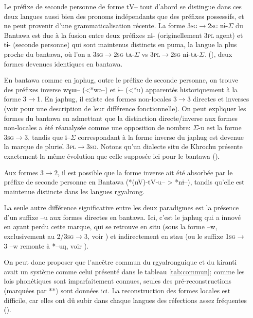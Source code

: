 \documentclass[oldfontcommands,oneside,a4paper,11pt]{article}
\newcommand{\ipa}[1]{{\phon \mbox{#1}}} %
\newcommand{\ro}{$\Sigma$}
\begin{document}
Le préfixe de seconde personne de forme \ipa{tV--} tout d'abord se distingue dans ces deux langues aussi bien des pronoms indépendants que des préfixes possessifs, et ne peut provenir d'une grammaticalisation récente. La forme \textsc{3sg$\rightarrow$2sg} \ipa{nɨ-}\ro{} du Bantawa est due à la fusion entre deux préfixes \ipa{nɨ-} (originellement \textsc{3pl} agent)  et \ipa{tɨ-} (seconde personne) qui sont maintenus distincts en puma, la langue la plus proche du bantawa, où l'on a \textsc{3sg$\rightarrow$2sg} \ipa{tʌ-}\ro{} vs \textsc{3pl$\rightarrow$2sg} \ipa{ni-tʌ-}\ro{}. (\citealt{bickel07puma}), deux formes devenues identiques en bantawa.

En bantawa comme en japhug, outre le préfixe de seconde personne, on trouve des préfixes  inverse \ipa{wɣɯ--} (<*\ipa{wə--}) et \ipa{ɨ--} (<*\ipa{u}) apparentés historiquement à la forme \textsc{3$\rightarrow$1}. En japhug, il existe des formes non-locales 3$\rightarrow$3 directes et inverses (voir  \citealt{jacques10inverse} pour une description de leur différence fonctionnelle). On peut expliquer les formes du bantawa en admettant que la distinction directe/inverse aux formes non-locales a été réanalysée comme une opposition de nombre:  \ro{}-\ipa{u} est la forme \textsc{3sg$\rightarrow$3}, tandis que  \ipa{ɨ--}\ro{} correspondant à la forme inverse du japhug est devenue la marque de pluriel \textsc{3pl$\rightarrow$3sg}. Notons qu'un dialecte situ de Khrochu présente exactement la même évolution que celle supposée ici pour le bantawa (\citealt{jackson15khrochu}).

Aux formes \textsc{3$\rightarrow$2}, il est possible que la forme inverse ait été absorbée par le préfixe de seconde personne en Bantawa (*\ipa{(nV)-tV-u--}  > *\ipa{nɨ--}), tandis qu'elle est maintenue distincte dans les langues rgyalrong. 

La seule autre différence significative entre les deux paradigmes est la présence d'un suffixe \ipa{--u} aux formes directes en bantawa. Ici, c'est le japhug qui a innové en ayant perdu cette marque, qui se retrouve en situ (sous la forme \ipa{--w}, exclusivement au \textsc{2/3sg$\rightarrow$3}, voir \citealt{linyj03tense}) et indirectement en stau (ou le suffixe \textsc{1sg$\rightarrow$3} \ipa{--w} remonte à *\ipa{--uŋ}, voir \citealt{jacques14rtau}).

On peut donc proposer que l'ancêtre commun du rgyalronguique et du kiranti avait un système comme celui présenté dans le tableau \ref{tab:commun};  comme les lois phonétiques sont imparfaitement connues, seules des pré-reconstructions (marquées par **) sont données ici. La reconstruction des formes locales est difficile, car elles ont dû subir dans chaque langues des réfections assez fréquentes (\citealt{heath98skewing}).
\end{document}
